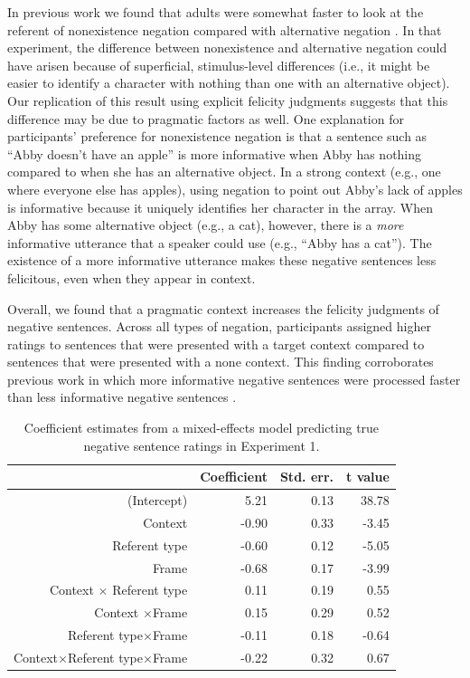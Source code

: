 \documentclass[man, noapacite]{apa2}
\begin{document}
In previous work we found that adults were somewhat faster to look at the referent of nonexistence negation compared with alternative negation \cite{nordmeyer2014b}. In that experiment, the difference between nonexistence and alternative negation could have arisen because of superficial, stimulus-level differences (i.e., it might be easier to identify a character with nothing than one with an alternative object). Our replication of this result using explicit felicity judgments suggests that this difference may be due to pragmatic factors as well. One explanation for participants' preference for nonexistence negation is that a sentence such as ``Abby doesn't have an apple'' is more informative when Abby has nothing compared to when she has an alternative object. In a strong context (e.g., one where everyone else has apples), using negation to point out Abby's lack of apples is informative because it uniquely identifies her character in the array. When Abby has some alternative object (e.g., a cat), however, there is a \emph{more} informative utterance that a speaker could use (e.g., ``Abby has a cat''). The existence of a more informative utterance makes these negative sentences less felicitous, even when they appear in context.

Overall, we found that a pragmatic context increases the felicity judgments of negative sentences. Across all types of negation, participants assigned higher ratings to sentences that were presented with a target context compared to sentences that were presented with a none context. This finding corroborates previous work in which more informative negative sentences were processed faster than less informative negative sentences \cite{nordmeyer2014}.

\begin{table}[t]
\caption{\label{tab:s1} Coefficient estimates from a mixed-effects model predicting true negative sentence ratings in Experiment 1.}
\begin{center}
\small\addtolength{\tabcolsep}{-5pt}
\begin{tabular}{rrrr}
 \hline
 & Coefficient & Std. err. & t value \\
 \hline
(Intercept) & 5.21 & 0.13 & 38.78 \\
 Context & -0.90 & 0.33 & -3.45 \\
 Referent type & -0.60 & 0.12 & -5.05 \\
 Frame & -0.68 & 0.17 & -3.99 \\
 Context $\times$ Referent type & 0.11 & 0.19 & 0.55 \\
 Context $\times$Frame & 0.15 & 0.29 & 0.52 \\
 Referent type$\times$Frame & -0.11 & 0.18 & -0.64 \\
 Context$\times$Referent type$\times$Frame & -0.22 & 0.32 & 0.67 \\
 \hline
\end{tabular}
\end{center}
\end{table}
\end{document}
